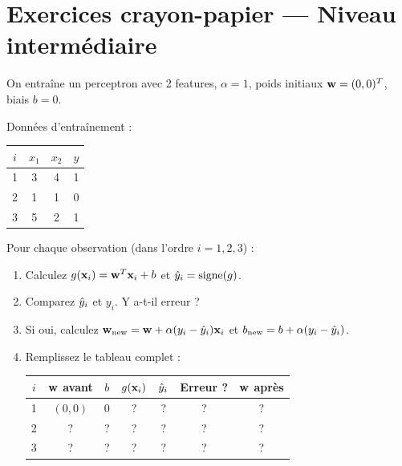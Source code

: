 \section*{Exercices crayon-papier --- Niveau interm\'{e}diaire}


On entra\^{i}ne un perceptron avec 2 features, $\alpha = 1$, poids initiaux $\mathbf{w} = (0, 0)^T$, biais $b = 0$.

Donn\'{e}es d'entra\^{i}nement :

\begin{center}
\renewcommand{\arraystretch}{1.2}
\begin{tabular}{c|cc|c}
    \toprule
    $i$ & $x_1$ & $x_2$ & $y$ \\
    \midrule
    1 & 3 & 4 & 1 \\
    2 & 1 & 1 & 0 \\
    3 & 5 & 2 & 1 \\
    \bottomrule
\end{tabular}
\end{center}

Pour chaque observation (dans l'ordre $i = 1, 2, 3$) :

\begin{enumerate}[label=\alph*)]
    \item Calculez $g(\mathbf{x}_i) = \mathbf{w}^T\mathbf{x}_i + b$ et $\hat{y}_i = \text{signe}(g)$.

    \item Comparez $\hat{y}_i$ et $y_i$. Y a-t-il erreur ?

    \item Si oui, calculez $\mathbf{w}_{\text{new}} = \mathbf{w} + \alpha(y_i - \hat{y}_i)\mathbf{x}_i$
        et $b_{\text{new}} = b + \alpha(y_i - \hat{y}_i)$.

    \item Remplissez le tableau complet :

    \begin{center}
    \renewcommand{\arraystretch}{1.3}
    \begin{tabular}{c|c|c|c|c|c|c}
        \toprule
        $i$ & $\mathbf{w}$ avant & $b$ & $g(\mathbf{x}_i)$ & $\hat{y}_i$ & Erreur ? & $\mathbf{w}$ apr\`{e}s \\
        \midrule
        1 & $(0, 0)$ & 0 & ? & ? & ? & ? \\
        2 & ?        & ? & ? & ? & ? & ? \\
        3 & ?        & ? & ? & ? & ? & ? \\
        \bottomrule
    \end{tabular}
    \end{center}
\end{enumerate}

